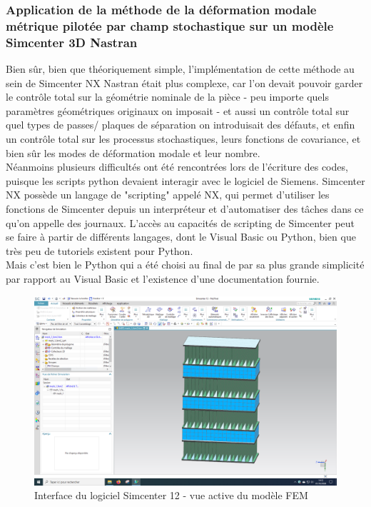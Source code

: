 \documentclass[a4paper,10pt]{article}
\begin{document}
\subsubsection{Application de la méthode de la déformation modale métrique pilotée par champ stochastique sur un modèle Simcenter 3D Nastran}

Bien sûr, bien que théoriquement simple, l'implémentation de cette méthode au sein de Simcenter NX Nastran était plus complexe, car l'on devait pouvoir garder le contrôle total sur la géométrie nominale de la pièce - peu importe quels paramètres géométriques originaux on imposait - et aussi un contrôle total sur quel types de passes/ plaques de séparation on introduisait des défauts, et enfin un contrôle total sur les processus stochastiques, leurs fonctions de covariance, et bien sûr les modes de déformation modale et leur nombre.\\

Néanmoins plusieurs difficultés ont été rencontrées lors de l'écriture des codes, puisque les scripts python devaient interagir avec le logiciel de Siemens. Simcenter NX possède un langage de "scripting" appelé NX, qui permet d'utiliser les fonctions de Simcenter depuis un interpréteur et d'automatiser des tâches dans ce qu'on appelle des journaux. L'accès au capacités de scripting de Simcenter peut se faire à partir de différents langages, dont le Visual Basic ou Python, bien que très peu de tutoriels existent pour Python. \\

Mais c'est bien le Python qui a été choisi au final de par sa plus grande simplicité par rapport au Visual Basic et l'existence d'une documentation fournie. \\

\begin{figure}[H]
   \centering   
   \includegraphics[scale=0.18]{SimcenterInterface.PNG}
      \caption{Interface du logiciel Simcenter 12 - vue active du modèle FEM}
         \label{SimcenterInterface}
\end{figure}
\end{document}
